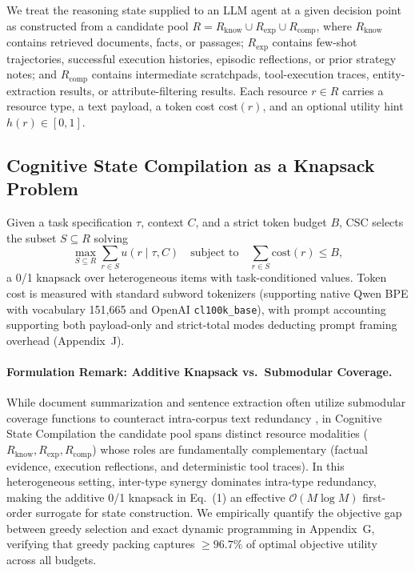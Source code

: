 \documentclass{article}
\begin{document}
We treat the reasoning state supplied to an LLM agent at a given decision point as constructed from a candidate pool $R = R_{\text{know}} \cup R_{\text{exp}} \cup R_{\text{comp}}$, where $R_{\text{know}}$ contains retrieved documents, facts, or passages; $R_{\text{exp}}$ contains few-shot trajectories, successful execution histories, episodic reflections, or prior strategy notes; and $R_{\text{comp}}$ contains intermediate scratchpads, tool-execution traces, entity-extraction results, or attribute-filtering results. Each resource $r \in R$ carries a resource type, a text payload, a token cost $\text{cost}(r)$, and an optional utility hint $h(r) \in [0,1]$.

\subsection{Cognitive State Compilation as a Knapsack Problem}

Given a task specification $\tau$, context $C$, and a strict token budget $B$, CSC selects the subset $S \subseteq R$ solving
\begin{equation}
\max_{S \subseteq R} \sum_{r \in S} u(r \mid \tau, C) \quad \text{subject to} \quad \sum_{r \in S} \text{cost}(r) \leq B,
\end{equation}
a 0/1 knapsack over heterogeneous items with task-conditioned values. Token cost is measured with standard subword tokenizers (supporting native Qwen BPE with vocabulary 151,665 and OpenAI \texttt{cl100k\_base}), with prompt accounting supporting both payload-only and strict-total modes deducting prompt framing overhead (Appendix~J).

\paragraph{Formulation Remark: Additive Knapsack vs.\ Submodular Coverage.} While document summarization and sentence extraction often utilize submodular coverage functions to counteract intra-corpus text redundancy \citep{lin2010submodular}, in Cognitive State Compilation the candidate pool spans distinct resource modalities ($R_{\text{know}}, R_{\text{exp}}, R_{\text{comp}}$) whose roles are fundamentally complementary (factual evidence, execution reflections, and deterministic tool traces). In this heterogeneous setting, inter-type synergy dominates intra-type redundancy, making the additive 0/1 knapsack in Eq.~(1) an effective $\mathcal{O}(M \log M)$ first-order surrogate for state construction. We empirically quantify the objective gap between greedy selection and exact dynamic programming in Appendix~G, verifying that greedy packing captures $\ge 96.7\%$ of optimal objective utility across all budgets.
\end{document}
